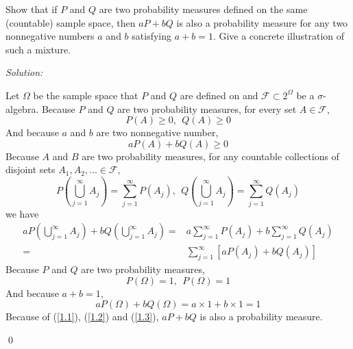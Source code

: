 \documentclass[12pt]{article}
\newenvironment{problem}[2][Problem]{\begin{trivlist}
\item[\hskip \labelsep {\bfseries #1}\hskip \labelsep {\bfseries #2.}]}{\end{trivlist}}
\newenvironment{sol}
    {\emph{Solution:}
    }
    {
    \qed
    }
\begin{document}




\begin{problem}{1} 
Show that if $P$ and $Q$ are two probability measures defined on the same (countable) sample space, then $aP+bQ$ is also a probability measure for any two nonnegative numbers $a$ and $b$ satisfying $a+b=1$. Give a concrete illustration of such a mixture.
\end{problem}
\begin{sol}
Let $\Omega$ be the sample space that $P$ and $Q$ are defined on and $\mathscr{F}\subset2^{\Omega}$ be a $\sigma$-algebra. Because $P$ and $Q$ are two probability measures, for every set $A\in\mathscr{F}$,
\[
P(A)\geq0,~~Q(A)\geq0
\]
And because $a$ and $b$ are two nonnegative number,
\begin{equation}
\label{1.1}
aP(A)+bQ(A)\geq0
\end{equation}
Because $A$ and $B$ are two probability measures, for any countable collections of disjoint sets $A_1, A_2, ...\in\mathscr{F}$,
\[
P(\bigcup_{j=1}^{\infty}A_j)=\sum_{j=1}^{\infty}P(A_j),~~Q(\bigcup_{j=1}^{\infty}A_j)=\sum_{j=1}^{\infty}Q(A_j)
\]
we have
\begin{equation}
\label{1.2}
\begin{split}
aP(\bigcup_{j=1}^{\infty}A_j)+bQ(\bigcup_{j=1}^{\infty}A_j)=&a\sum_{j=1}^{\infty}P(A_j)+b\sum_{j=1}^{\infty}Q(A_j)\\
=&\sum_{j=1}^{\infty}[aP(A_j)+bQ(A_j)]
\end{split}
\end{equation}
Because $P$ and $Q$ are two probability measures,
\[
P(\Omega)=1,~~P(\Omega)=1
\]
And because $a+b=1$,
\begin{equation}
\label{1.3}
aP(\Omega)+bQ(\Omega)=a\times1+b\times1=1
\end{equation}
Because of (\ref{1.1}), (\ref{1.2}) and (\ref{1.3}), $aP+bQ$ is also a probability measure.


\end{sol}
\end{document}

